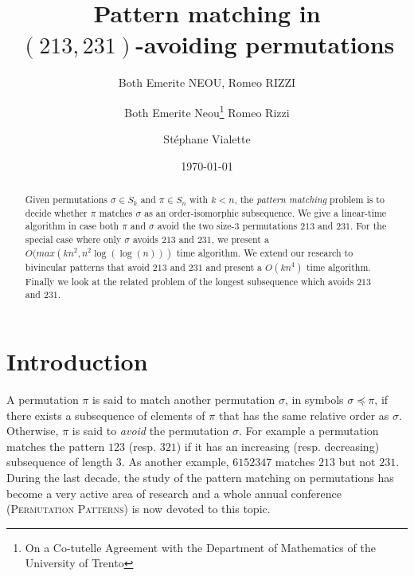 \documentclass[a4paper]{llncs}
\begin{document}

\title{Pattern matching in\\ $(213,231)$-avoiding permutations}
\author{Both Emerite NEOU, Romeo RIZZI}
\date{}

\author{%
	Both Emerite Neou\thanks{On a Co-tutelle  Agreement with the Department of Mathematics of the University of Trento}
  Romeo Rizzi \and
  St\'ephane Vialette
}%

\date{\today}

\maketitle

\begin{abstract}
	Given permutations $\sigma \in S_k$ and $\pi \in S_n$ with $k<n$, the
  \emph{pattern matching} problem is to decide whether $\pi$ matches
  $\sigma$ as an order-isomorphic subsequence.
	We give a linear-time algorithm in case both $\pi$ and $\sigma$ avoid
	the two size-$3$ permutations $213$ and $231$.
	For the special case where only $\sigma$ avoids $213$ and $231$, we present a
	$O(max(kn^2,n^2\log(\log(n)))$ time algorithm. 
	We extend our research to bivincular patterns that avoid $213$ and $231$ and present a $O(kn^4)$ time algorithm.
	Finally we look at the related problem of the longest subsequence which avoids $213$ and $231$.  
\end{abstract}



\section{Introduction}
\label{section:Introduction}

   

	A permutation $\pi$ is said to match another permutation $\sigma$,
	in symbols $\sigma \preceq \pi$,
	if there exists a subsequence of elements of $\pi$ that has the same relative
	order as $\sigma$.
	Otherwise, $\pi$ is said to \emph{avoid} the permutation $\sigma$.
	For example a permutation matches the pattern $123$ (resp. $321$) if it has
	an increasing (resp. decreasing) subsequence of length $3$.
	As another example,
	$6152347$ matches $213$ but not $231$.
	During the last decade, the study of the pattern matching on permutations has
	become a very active area of research \cite{Kitaev:book:2011} and
	a whole annual conference (\textsc{Permutation Patterns}) is now devoted
	to this topic.
\end{document}
